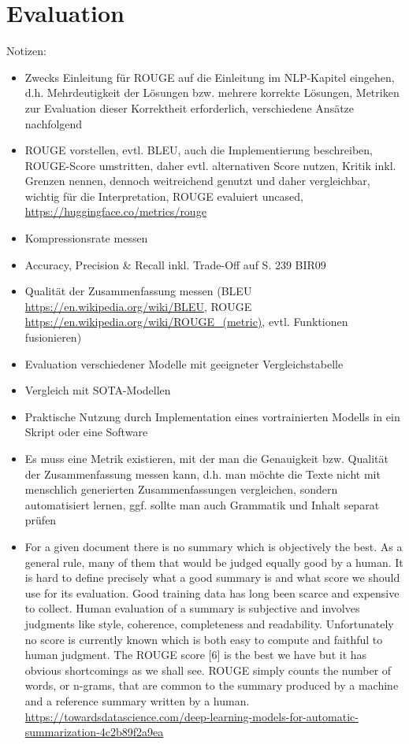 \section{Evaluation}
Notizen:
\begin{itemize}
	\item Zwecks Einleitung für ROUGE auf die Einleitung im NLP-Kapitel eingehen, d.h. Mehrdeutigkeit der Lösungen bzw. mehrere korrekte Lösungen, Metriken zur Evaluation dieser Korrektheit erforderlich, verschiedene Ansätze nachfolgend
	\item ROUGE vorstellen, evtl. BLEU, auch die Implementierung beschreiben, ROUGE-Score umstritten, daher evtl. alternativen Score nutzen, Kritik inkl. Grenzen nennen, dennoch weitreichend genutzt und daher vergleichbar, wichtig für die Interpretation, ROUGE evaluiert uncased, \url{https://huggingface.co/metrics/rouge}
	\item Kompressionsrate messen
	\item Accuracy, Precision & Recall inkl. Trade-Off auf S. 239 BIR09
	\item Qualität der Zusammenfassung messen (BLEU \url{https://en.wikipedia.org/wiki/BLEU}, ROUGE \url{https://en.wikipedia.org/wiki/ROUGE_(metric)}, evtl. Funktionen fusionieren)
	\item Evaluation verschiedener Modelle mit geeigneter Vergleichstabelle
	\item Vergleich mit SOTA-Modellen
	\item Praktische Nutzung durch Implementation eines vortrainierten Modells in ein Skript oder eine Software
	\item Es muss eine Metrik existieren, mit der man die Genauigkeit bzw. Qualität der Zusammenfassung messen kann, d.h. man möchte die Texte nicht mit menschlich generierten Zusammenfassungen vergleichen, sondern automatisiert lernen, ggf. sollte man auch Grammatik und Inhalt separat prüfen
	\item For a given document there is no summary which is objectively the best. As a general rule, many of them that would be judged equally good by a human. It is hard to define precisely what a good summary is and what score we should use for its evaluation. Good training data has long been scarce and expensive to collect. Human evaluation of a summary is subjective and involves judgments like style, coherence, completeness and readability. Unfortunately no score is currently known which is both easy to compute and faithful to human judgment. The ROUGE score [6] is the best we have but it has obvious shortcomings as we shall see. ROUGE simply counts the number of words, or n-grams, that are common to the summary produced by a machine and a reference summary written by a human. \url{https://towardsdatascience.com/deep-learning-models-for-automatic-summarization-4c2b89f2a9ea}

\end{itemize}

